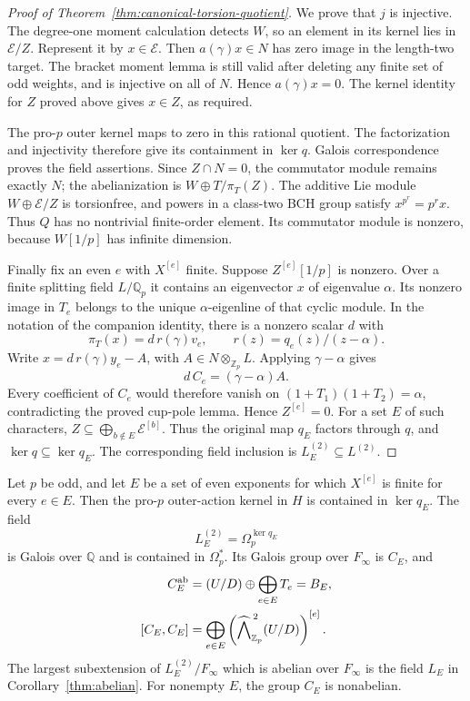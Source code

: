 \begin{proof}[Proof of Theorem~\ref{thm:canonical-torsion-quotient}]
We prove that $j$ is injective. The degree-one moment
calculation detects $W$, so an element in its kernel lies
in $\mathcal E/Z$. Represent it by $x\in\mathcal E$.
Then $a(\gamma)x\in N$ has zero image in the length-two
target. The bracket moment lemma is still valid after
deleting any finite set of odd weights, and is injective
on all of $N$. Hence $a(\gamma)x=0$. The kernel identity
for $Z$ proved above gives $x\in Z$, as required.

The pro-$p$ outer kernel maps to zero in this rational
quotient. The factorization and injectivity therefore give
its containment in $\ker q$. Galois correspondence proves
the field assertions. Since $Z\cap N=0$, the commutator
module remains exactly $N$; the abelianization is
$W\oplus T/\pi_T(Z)$. The additive Lie module
$W\oplus\mathcal E/Z$ is torsionfree, and powers in a
class-two BCH group satisfy $x^{p^r}=p^rx$. Thus $Q$ has
no nontrivial finite-order element. Its commutator module
is nonzero, because $W[1/p]$ has infinite dimension.

Finally fix an even $e$ with $X^{[e]}$ finite.
Suppose $Z^{[e]}[1/p]$ is nonzero. Over a finite splitting
field $L/\mathbb Q_p$ it contains an eigenvector $x$ of eigenvalue $\alpha$.
Its nonzero image in $T_e$ belongs to the unique
$\alpha$-eigenline of that cyclic module. In the notation
of the companion identity, there is a nonzero scalar $d$
with
\[
 \pi_T(x)=d\,r(\gamma)v_e,\qquad
 r(z)=q_e(z)/(z-\alpha).
\]
Write $x=d\,r(\gamma)y_e-A$, with $A\in N\otimes_{\mathbb Z_p}L$.
Applying $\gamma-\alpha$ gives
\[
                         d\,C_e=(\gamma-\alpha)A.
\]
Every coefficient of $C_e$ would therefore vanish on
$(1+T_1)(1+T_2)=\alpha$, contradicting the proved cup-pole
lemma. Hence $Z^{[e]}=0$. For a set $E$ of such characters,
$Z\subseteq\bigoplus_{b\notin E}\mathcal E^{[b]}$.
Thus the original map $q_E$ factors through $q$, and
$\ker q\subseteq\ker q_E$. The corresponding field
inclusion is $L_E^{(2)}\subseteq L^{(2)}$.
\end{proof}



\begin{corollary}
\label{thm:class-two-components}
Let $p$ be odd, and let $E$ be a set of even exponents for which
$X^{[e]}$ is finite for every $e\in E$.
Then the pro-$p$ outer-action kernel in $H$ is contained
in $\ker q_E$.  The field
\[
 L_E^{(2)}=\Omega_p^{\ker q_E}
\]
is Galois over $\mathbb Q$ and is contained in $\Omega_p^*$.
Its Galois group over $F_\infty$ is $C_E$, and
\begin{align*}
 C_E^{\rm ab}&=(U/D)\oplus\bigoplus_{e\in E}T_e=B_E,\\
 [C_E,C_E]&=\bigoplus_{e\in E}
       \left(\widehat{\bigwedge}^{\,2}_{\mathbb Z_p}(U/D)\right)^{[e]}.
\end{align*}
The largest subextension of $L_E^{(2)}/F_\infty$ which is
abelian over $F_\infty$ is the field $L_E$ in
Corollary~\ref{thm:abelian}.  For nonempty $E$, the group $C_E$
is nonabelian.
\end{corollary}

